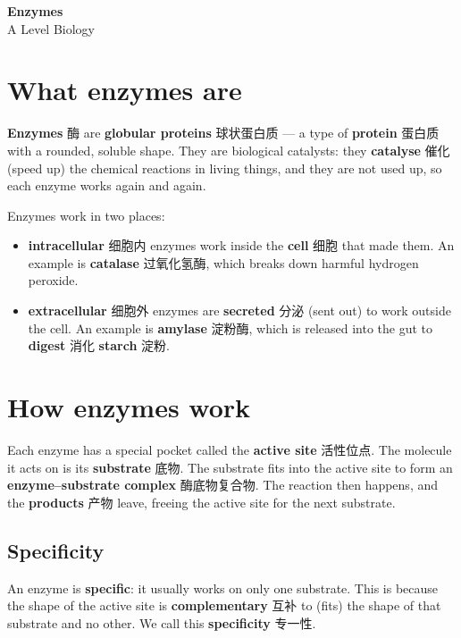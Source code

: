 \documentclass[11pt]{article}
\begin{document}
\begin{center}
  {\LARGE\bfseries Enzymes}\\[0.35em]
  {\large A Level Biology}
\end{center}
\vspace{0.6em}

\section*{What enzymes are}

\textbf{Enzymes} 酶 are \textbf{globular proteins} 球状蛋白质 — a type of \textbf{protein} 蛋白质 with a rounded, soluble shape. They are biological catalysts: they \textbf{catalyse} 催化 (speed up) the chemical reactions in living things, and they are not used up, so each enzyme works again and again.

Enzymes work in two places:

\begin{itemize}
\item \textbf{intracellular} 细胞内 enzymes work inside the \textbf{cell} 细胞 that made them. An example is \textbf{catalase} 过氧化氢酶, which breaks down harmful hydrogen peroxide.

\item \textbf{extracellular} 细胞外 enzymes are \textbf{secreted} 分泌 (sent out) to work outside the cell. An example is \textbf{amylase} 淀粉酶, which is released into the gut to \textbf{digest} 消化 \textbf{starch} 淀粉.

\end{itemize}

\section*{How enzymes work}

Each enzyme has a special pocket called the \textbf{active site} 活性位点. The molecule it acts on is its \textbf{substrate} 底物. The substrate fits into the active site to form an \textbf{enzyme–substrate complex} 酶底物复合物. The reaction then happens, and the \textbf{products} 产物 leave, freeing the active site for the next substrate.

\subsection*{Specificity}

An enzyme is \textbf{specific}: it usually works on only one substrate. This is because the shape of the active site is \textbf{complementary} 互补 to (fits) the shape of that substrate and no other. We call this \textbf{specificity} 专一性.
\end{document}
